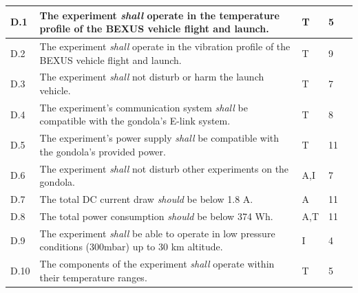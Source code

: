 \documentclass[a4paper,12pt,twoside]{article}
\providecommand{\DIFaddend}{} %
\DeclareRobustCommand{\DIFaddend}{\DIFOaddend \let\includegraphics\DIFOincludegraphics} %
\begin{document}
\begin{longtable}[]{|m{}| m{} |m{} |m{}|m{}|}
\DIFaddend D.1  & The experiment \textit{shall} operate in the temperature profile of the BEXUS vehicle flight and launch.                                                                         &       T       & 5            &        \\ \hline
D.2  & The experiment \textit{shall} operate in the vibration profile of the BEXUS vehicle flight and launch.                                                                           &       T       & 9            &        \\ \hline
D.3  & The experiment \textit{shall} not disturb or harm the launch vehicle.                                                                                                            &      T        & 7            &        \\ \hline
D.4  & The experiment's communication system \textit{shall} be compatible with the gondola's E-link system.                                                                             &      T        & 8            &        \\ \hline
D.5  & The experiment's power supply \textit{shall
} be compatible with the gondola's provided power.                                                                                    &      T        &  11           &        \\ \hline
D.6  & The experiment \textit{shall} not disturb other experiments on the gondola.                                                                                                      &       A,I       & 7            &        \\ \hline
D.7  & The total DC current draw \textit{should} be below 1.8 A.                                                                                                                        &      A        & 11            &        \\ \hline
D.8  & The total power consumption \textit{should} be below 374 Wh.                                                                                                                      &       A,T       & 11            &        \\ \hline
D.9  & The experiment \textit{shall} be able to operate in low pressure conditions (300mbar) up to 30 km altitude.                                                                                       &      I        &  4           &        \\ \hline
D.10 & The components of the experiment \textit{shall} operate within their temperature ranges.                                                                                         &       T       & 5            &        \\  \hline

\end{longtable}
\end{document}
